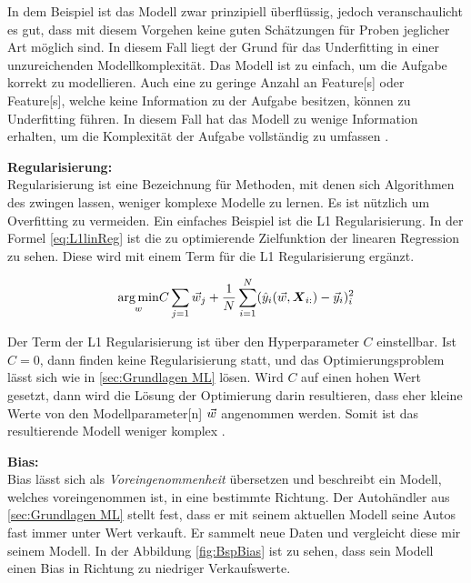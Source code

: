 
In dem Beispiel ist das Modell zwar prinzipiell überflüssig, jedoch veranschaulicht es gut, dass mit diesem Vorgehen keine guten Schätzungen für Proben jeglicher Art möglich sind. In diesem Fall liegt der Grund für das \gls{Underfitting} in einer unzureichenden Modellkomplexität. Das Modell ist zu einfach, um die Aufgabe korrekt zu modellieren. Auch eine zu geringe Anzahl an \gls{Feature}[s] oder \gls{Feature}[s], welche keine Information zu der Aufgabe besitzen, können zu \gls{Underfitting} führen. In diesem Fall hat das Modell zu wenige Information erhalten, um die Komplexität der Aufgabe vollständig zu umfassen \cite{Burkov.2019, Bishop.2006, Goodfellow.2016}.  \par

\textbf{\gls{Regularisierung}:}\\
\gls{Regularisierung} ist eine Bezeichnung für Methoden, mit denen sich Algorithmen des  zwingen lassen, weniger komplexe Modelle zu lernen. Es ist nützlich um \gls{Overfitting} zu vermeiden. Ein einfaches Beispiel ist die L1 \gls{Regularisierung}. In der Formel \ref{eq:L1linReg} ist die zu optimierende \gls{Zielfunktion} der linearen Regression zu sehen. Diese wird mit einem Term für die L1 \gls{Regularisierung} ergänzt.

\begin{equation}
    \label{eq:L1linReg}
    \underset{w}{\arg\min} C\sum_{j=1}\vec{w}_j + \frac{1}{N} \sum_{i=1}^{N} (\hat{y}_i(\vec{w}, \boldsymbol{X}_{i:}) - \vec{y}_i)_i^2
\end{equation}

Der Term der L1 \gls{Regularisierung} ist über den \gls{Hyperparameter} \(C\) einstellbar. Ist \(C=0\), dann finden keine \gls{Regularisierung} statt, und das Optimierungsproblem lässt sich wie in \ref{sec:Grundlagen ML} lösen. Wird \(C\) auf einen hohen Wert gesetzt, dann wird die Lösung der Optimierung darin resultieren, dass eher kleine Werte von den  \gls{Modellparameter}[n] \(\vec{w}\) angenommen werden. Somit ist das resultierende Modell weniger komplex \cite{Burkov.2019}. \par

\textbf{\gls{Bias}:}\\
\gls{Bias} lässt sich als \textit{Voreingenommenheit} übersetzen und beschreibt ein Modell, welches voreingenommen ist, in eine bestimmte Richtung. Der Autohändler aus \ref{sec:Grundlagen ML} stellt fest, dass er mit seinem aktuellen Modell seine Autos fast immer unter Wert verkauft. Er sammelt neue Daten und vergleicht diese mir seinem Modell. In der Abbildung \ref{fig:BspBias} ist zu sehen, dass sein Modell einen \gls{Bias} in Richtung zu niedriger Verkaufswerte.


